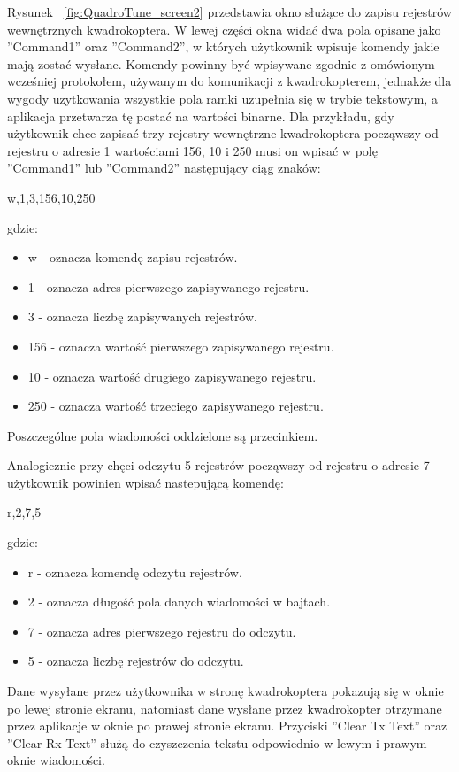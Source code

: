 Rysunek ~\ref{fig:QuadroTune_screen2} przedstawia okno służące do zapisu rejestrów wewnętrznych kwadrokoptera. W lewej części okna widać dwa pola opisane jako ''Command1'' oraz ''Command2'', w których użytkownik wpisuje komendy jakie mają zostać wysłane. Komendy powinny być wpisywane zgodnie z omówionym wcześniej protokołem, używanym do komunikacji z kwadrokopterem, jednakże dla wygody uzytkowania wszystkie pola ramki uzupełnia się w trybie tekstowym, a aplikacja przetwarza tę postać na wartości binarne. Dla przykładu, gdy użytkownik chce zapisać trzy rejestry wewnętrzne kwadrokoptera począwszy od rejestru o adresie 1 wartościami 156, 10 i 250 musi on wpisać w polę ''Command1'' lub ''Command2'' następujący ciąg znaków:

w,1,3,156,10,250

gdzie:
\begin{itemize}
	\item w - oznacza komendę zapisu rejestrów.
	\item 1 - oznacza adres pierwszego zapisywanego rejestru.
	\item 3 - oznacza liczbę zapisywanych rejestrów.
	\item 156 - oznacza wartość pierwszego zapisywanego rejestru.
	\item 10 - oznacza wartość drugiego zapisywanego rejestru.
	\item 250 - oznacza wartość trzeciego zapisywanego rejestru.
\end{itemize}
Poszczególne pola wiadomości oddzielone są przecinkiem.

Analogicznie przy chęci odczytu 5 rejestrów począwszy od rejestru o adresie 7 użytkownik powinien wpisać nastepującą komendę:

r,2,7,5

gdzie:
\begin{itemize}
	\item r - oznacza komendę odczytu rejestrów.
	\item 2 - oznacza długość pola danych wiadomości w bajtach.
	\item 7 - oznacza adres pierwszego rejestru do odczytu.
	\item 5 - oznacza liczbę rejestrów do odczytu.
\end{itemize}
Dane wysyłane przez użytkownika w stronę kwadrokoptera pokazują się w oknie po lewej stronie ekranu, natomiast dane wysłane przez kwadrokopter  otrzymane przez aplikacje w oknie po prawej stronie ekranu. Przyciski ''Clear Tx Text'' oraz ''Clear Rx Text'' służą do czyszczenia tekstu odpowiednio w lewym i prawym oknie wiadomości. 

